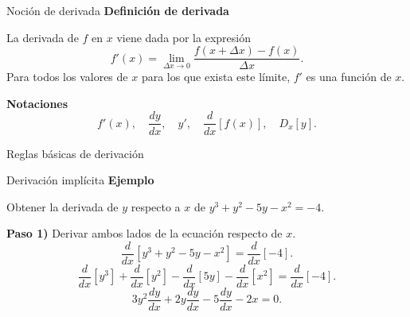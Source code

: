 \documentclass[main.tex]{subfiles}
\begin{document}
\graphicspath{{imagenes/tema2/}{../imagenes/tema2/}}

\begin{frame}{Noción de derivada}
\textbf{Definición de derivada}\par
La derivada de $f$ en $x$ viene dada por la expresión
\[f'(x)=\lim_{\Delta x\to0}\frac{f(x+\Delta x)-f(x)}{\Delta x}.\]
Para todos los valores de $x$ para los que exista este límite, $f'$ es una función de $x$.
\medskip

\textbf{Notaciones}
\[f'(x),\quad\frac{dy}{dx},\quad y',\quad\frac{d}{dx}[f(x)],\quad D_x[y].\]
\end{frame}
\begin{frame}{Reglas básicas de derivación}
\scriptsize\renewcommand{\arraystretch}{1.4}
\end{frame}
\begin{frame}{Derivación implícita}
\textbf{Ejemplo}\par Obtener la derivada de $y$ respecto a $x$ de $y^3+y^2-5y-x^2=-4$.\medskip

\textbf{Paso 1)} Derivar ambos lados de la ecuación respecto de $x$.
\[\frac{d}{dx}[y^3+y^2-5y-x^2]=\frac{d}{dx}[-4].\]
\[\frac{d}{dx}[y^3]+\frac{d}{dx}[y^2]-\frac{d}{dx}[5y]-\frac{d}{dx}[x^2]=\frac{d}{dx}[-4].\]
\[3y^2\frac{dy}{dx}+2y\frac{dy}{dx}-5\frac{dy}{dx}-2x=0.\]
\end{frame}
\end{document}
